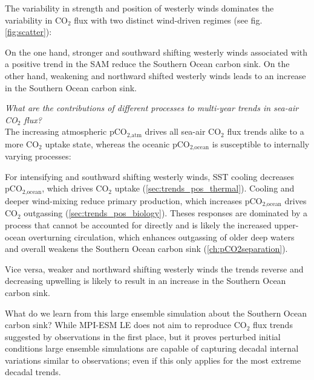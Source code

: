 The variability in strength and position of westerly winds dominates the variability in CO$_2$ flux with two distinct wind-driven regimes (see fig. \ref{fig:scatter}): 

On the one hand, stronger and southward shifting westerly winds associated with a positive trend in the \acf{SAM} reduce the Southern Ocean carbon sink. On the other hand, weakening and northward shifted westerly winds leads to an increase in the Southern Ocean carbon sink.\newline

\textit{What are the contributions of different processes to multi-year trends in sea-air CO$_2$ flux?}\\
The increasing atmospheric pCO$_{\text{2,atm}}$ drives all sea-air CO$_2$ flux trends alike to a more CO$_2$ uptake state, whereas the oceanic pCO$_{\text{2,ocean}}$ is susceptible to internally varying processes:

For intensifying and southward shifting westerly winds, \acf{SST} cooling decreases pCO$_{\text{2,ocean}}$, which drives CO$_2$ uptake (\autoref{sec:trends_pos_thermal}). Cooling and deeper wind-mixing reduce primary production, which increases pCO$_{\text{2,ocean}}$ drives CO$_2$ outgassing (\autoref{sec:trends_pos_biology}). Theses responses are dominated by a process that cannot be accounted for directly and is likely the increased upper-ocean overturning circulation, which enhances outgassing of older deep waters  and overall weakens the Southern Ocean carbon sink (\autoref{ch:pCO2separation}). 

Vice versa, weaker and northward shifting westerly winds the trends reverse and decreasing upwelling is likely to result in an increase in the Southern Ocean carbon sink. %

\vspace{1.5cm}

What do we learn from this large ensemble simulation about the Southern Ocean carbon sink? While \acs{MPI-ESM LE} does not aim to reproduce CO$_2$ flux trends suggested by observations in the first place, but it proves perturbed initial conditions large ensemble simulations are capable of capturing decadal internal variations similar to observations; even if this only applies for the most extreme decadal trends.

